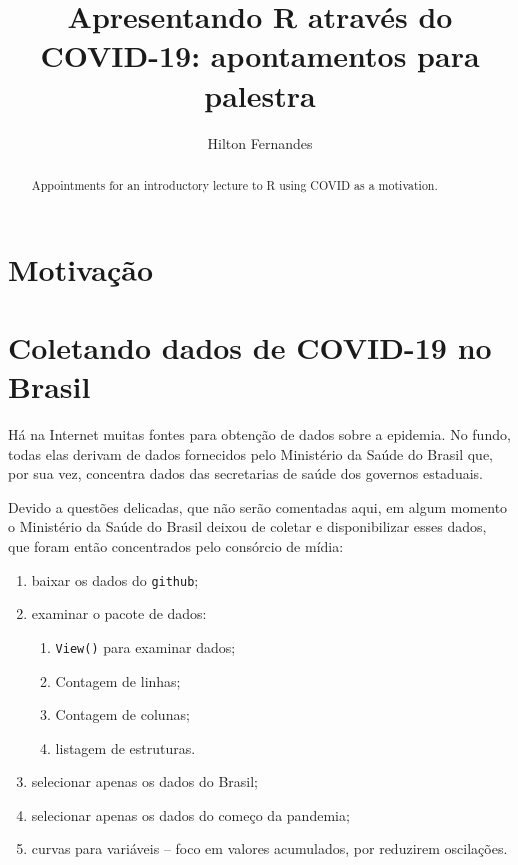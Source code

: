 \documentclass[a4paper,10pt]{article}
\title{Apresentando R através do COVID-19: apontamentos para palestra}
\author{Hilton Fernandes}
\begin{document}
\maketitle

\begin{abstract}
Appointments for an introductory lecture to R using COVID as a motivation.
\end{abstract}

\tableofcontents

\section{Motivação}

\section{Coletando dados de COVID-19 no Brasil}

Há na Internet muitas fontes para obtenção de dados sobre a epidemia. No fundo, 
todas elas derivam de dados fornecidos pelo Ministério da Saúde do Brasil que, 
por sua vez, concentra dados das secretarias de saúde dos governos estaduais. 

Devido a questões delicadas, que não serão comentadas aqui, em algum momento o 
Ministério da Saúde do Brasil deixou de coletar e disponibilizar esses dados, 
que foram então concentrados pelo consórcio de mídia:

\begin{enumerate}
    \item baixar os dados do {\tt github};
    \item examinar o pacote de dados: 
	\begin{enumerate}
	    \item {\tt View()} para examinar dados;
	    \item Contagem de linhas;
	    \item Contagem de colunas;
	    \item listagem de estruturas.
	\end{enumerate}

    \item selecionar apenas os dados do Brasil;
    \item selecionar apenas os dados do começo da pandemia;
    \item curvas para variáveis -- foco em valores acumulados, por reduzirem 
	oscilações.
\end{enumerate}
\end{document}
